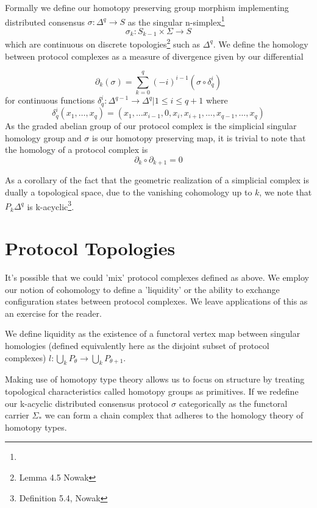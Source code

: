 \documentclass{article}
\begin{document}
Formally we define our homotopy preserving group morphism implementing distributed consensus $\sigma: \Delta^q \rightarrow S$ as the singular n-simplex\footnote{}
\begin{equation} \label{eq1}
\sigma_k: S_{k-1} \times \Sigma \rightarrow S
\end{equation} \label{eq1}
which are continuous on discrete topologies\footnote{Lemma 4.5 Nowak} such as $\Delta^q$. We define the homology between protocol complexes as a measure of divergence given by our differential 

\begin{equation} \label{eq1}
\partial_k(\sigma) = \sum^{q}_{k=0} (-i)^{i-1}(\sigma \circ \delta_q^{i} )
\end{equation} \label{eq1}
for continuous functions $\delta^{i}_q: \Delta^{q-1} \rightarrow \Delta^q | 1 \leq i \leq q+1$ where 
\begin{equation} \label{eq1}
\delta^{i}_q(x_1, \dots, x_q) = (x_1, \dots x_{i-1}, 0, x_i, x_{i+1}, \dots, x_{q-1}, \dots, x_q)
\end{equation} \label{eq1}
As the graded abelian group of our protocol complex is the simplicial singular homology group and $\sigma$ is our homotopy preserving map, it is trivial to note that the homology of a protocol complex is 
\begin{equation} \label{eq1}
\partial_k \circ \partial_{k+1} = 0
\end{equation} \label{eq1}

As a corollary of the fact that the geometric realization of a simplicial complex is dually a topological space, due to the vanishing cohomology up to $k$, we note that $P_k\Delta^q$ is k-acyclic\footnote{Definition 5.4, Nowak}.

\section{Protocol Topologies}
It's possible that we could 'mix' protocol complexes defined as above. We employ our notion of cohomology to define a 'liquidity' or the ability to exchange configuration states between protocol complexes. We leave applications of this as an exercise for the reader.

We define liquidity as the existence of a functoral vertex map between singular homologies (defined equivalently here as the disjoint subset of protocol complexes) $l: \bigcup_{k} P_{\theta} \rightarrow \bigcup_{k} P_{\theta+1}$.

Making use of homotopy type theory allows us to focus on structure by treating topological characteristics called homotopy groups as primitives. If we redefine our k-acyclic distributed consensus protocol $\sigma$ categorically as the functoral carrier $\Sigma_{*}$  we can form a chain complex that adheres to the homology theory of homotopy types.
\end{document}
